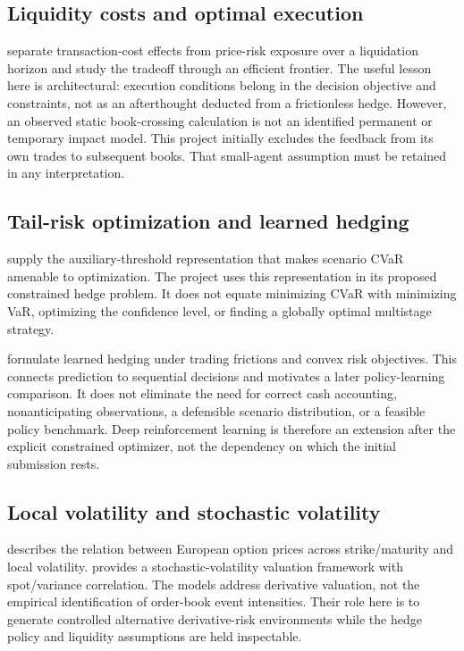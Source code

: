 \subsection{Liquidity costs and optimal execution}
\citet{almgren2001} separate transaction-cost effects from price-risk exposure over a liquidation horizon and study the tradeoff through an efficient frontier. The useful lesson here is architectural: execution conditions belong in the decision objective and constraints, not as an afterthought deducted from a frictionless hedge. However, an observed static book-crossing calculation is not an identified permanent or temporary impact model. This project initially excludes the feedback from its own trades to subsequent books. That small-agent assumption must be retained in any interpretation.

\subsection{Tail-risk optimization and learned hedging}
\citet{rockafellar2000} supply the auxiliary-threshold representation that makes scenario CVaR amenable to optimization. The project uses this representation in its proposed constrained hedge problem. It does not equate minimizing CVaR with minimizing VaR, optimizing the confidence level, or finding a globally optimal multistage strategy.

\citet{buehler2018} formulate learned hedging under trading frictions and convex risk objectives. This connects prediction to sequential decisions and motivates a later policy-learning comparison. It does not eliminate the need for correct cash accounting, nonanticipating observations, a defensible scenario distribution, or a feasible policy benchmark. Deep reinforcement learning is therefore an extension after the explicit constrained optimizer, not the dependency on which the initial submission rests.

\subsection{Local volatility and stochastic volatility}
\citet{dupire2010} describes the relation between European option prices across strike/maturity and local volatility. \citet{heston1993} provides a stochastic-volatility valuation framework with spot/variance correlation. The models address derivative valuation, not the empirical identification of order-book event intensities. Their role here is to generate controlled alternative derivative-risk environments while the hedge policy and liquidity assumptions are held inspectable.

